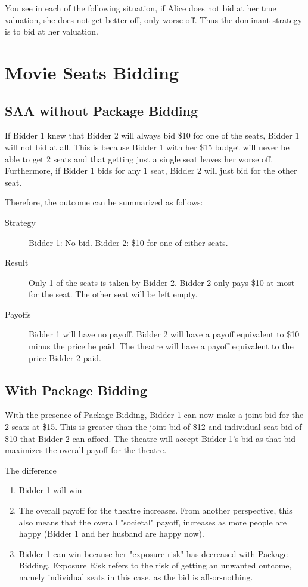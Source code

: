 \documentclass[]{article}
\begin{document}
You see in each of the following situation, if Alice does not bid at her true valuation, she does not get better off, only worse off. Thus the dominant strategy is to bid at her valuation.


\newpage
\section{Movie Seats Bidding}
\subsection{SAA without Package Bidding}

If Bidder 1 knew that Bidder 2 will always bid \$10 for one of the seats, Bidder 1 will not bid at all. This is because Bidder 1 with her \$15 budget will never be able to get 2 seats and that getting just a single seat leaves her worse off. Furthermore, if Bidder 1 bids for any 1 seat, Bidder 2 will just bid for the other seat.

Therefore, the outcome can be summarized as follows:
\begin{description}
	\item[Strategy] Bidder 1: No bid. Bidder 2: \$10 for one of either seats.
	\item[Result] Only 1 of the seats is taken by Bidder 2. Bidder 2 only pays \$10 at most for the seat. The other seat will be left empty. 
	\item[Payoffs] Bidder 1 will have no payoff. Bidder 2 will have a payoff equivalent to \$10 minus the price he paid. The theatre will have a payoff equivalent to the price Bidder 2 paid.
\end{description}

\subsection{With Package Bidding}

With the presence of Package Bidding, Bidder 1 can now make a joint bid for the 2 seats at \$15. This is greater than the joint bid of \$12 and individual seat bid of \$10 that Bidder 2 can afford. The theatre will accept Bidder 1's bid as that bid maximizes the overall payoff for the theatre. 

The difference
\begin{enumerate}
	\item Bidder 1 will win
	\item The overall payoff for the theatre increases. From another perspective, this also means that the overall "societal" payoff, increases as more people are happy (Bidder 1 and her husband are happy now).
	\item Bidder 1 can win because her "exposure risk" has decreased with Package Bidding. Exposure Risk refers to the risk of getting an unwanted outcome, namely individual seats in this case, as the bid is all-or-nothing.
\end{enumerate}
\end{document}
